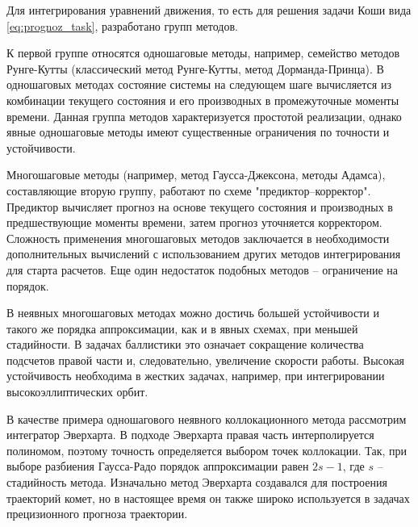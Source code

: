 Для интегрирования уравнений движения, то есть для решения задачи Коши вида \ref{eq:prognoz_task},
разработано групп методов. 

К первой группе относятся одношаговые методы, например,
семейство методов Рунге-Кутты (классический метод Рунге-Кутты, метод Дорманда-Принца).
В одношаговых методах состояние системы на следующем шаге вычисляется из комбинации
текущего состояния и его производных в промежуточные моменты времени. Данная группа
методов характеризуется простотой реализации,
однако явные одношаговые методы имеют существенные ограничения по точности и устойчивости.

Многошаговые методы (например, метод Гаусса-Джексона, методы Адамса), 
составляющие вторую группу, работают по схеме "предиктор--корректор".
Предиктор вычисляет прогноз на основе текущего состояния и производных в предшествующие
моменты времени, затем прогноз уточняется корректором. Сложность применения 
многошаговых методов заключается в необходимости дополнительных вычислений с использованием
других методов интегрирования для старта расчетов. Еще один недостаток подобных методов -- 
ограничение на порядок.

В неявных многошаговых методах можно достичь большей устойчивости и такого же порядка аппроксимации, 
как и в явных схемах, при меньшей стадийности. В задачах баллистики это означает сокращение количества 
подсчетов правой части и, следовательно, увеличение скорости работы. Высокая устойчивость
необходима в жестких задачах, например, при интегрировании высокоэллиптических орбит.

В качестве примера одношагового неявного коллокационного метода рассмотрим 
интегратор Эверхарта. В подходе Эверхарта правая часть интерполируется полиномом,
поэтому точность определяется выбором точек коллокации. Так, при выборе разбиения
Гаусса-Радо порядок аппроксимации равен $2 s - 1$, где $s$ -- стадийность метода.
Изначально метод Эверхарта создавался для построения траекторий комет, 
но в настоящее время он также широко используется в задачах прецизионного прогноза траектории.